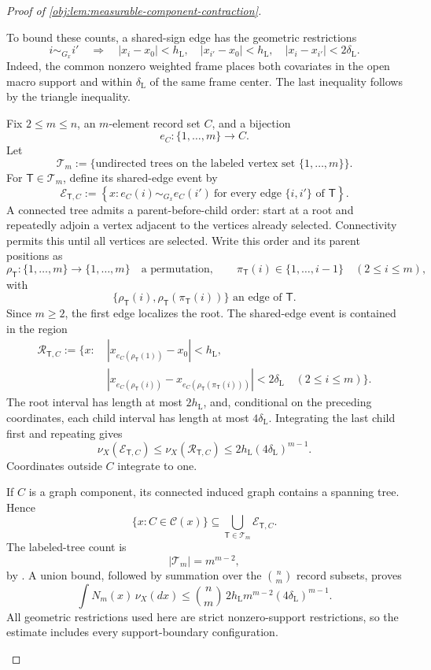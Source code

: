 \documentclass[11pt]{article}
\begin{document}
\begin{proof}[Proof of \cref{obj:lem:measurable-component-contraction}]
\begin{enumerate}
To bound these counts, a shared-sign edge has the geometric restrictions
\[
i\sim_{G_x}i'
\quad\Longrightarrow\quad
|x_i-x_0|<h_{\mathrm L},
\quad
|x_{i'}-x_0|<h_{\mathrm L},
\quad
|x_i-x_{i'}|<2\delta_{\mathrm L}.
\]
Indeed, the common nonzero weighted frame places both covariates in the open macro support and within \(\delta_{\mathrm L}\) of the same frame center. The last inequality follows by the triangle inequality.

Fix \(2\le m\le n\), an \(m\)-element record set \(C\), and a bijection
\[
e_C:\{1,\ldots,m\}\longrightarrow C.
\]
Let
\[
\mathscr T_m
:=\{\text{undirected trees on the labeled vertex set }\{1,\ldots,m\}\}.
\]
For \(\mathsf T\in\mathscr T_m\), define its shared-edge event by
\[
\mathcal E_{\mathsf T,C}
:=
\left\{
x:
e_C(i)\sim_{G_x}e_C(i')
\ \text{for every edge }\{i,i'\}\text{ of }\mathsf T
\right\}.
\]
A connected tree admits a parent-before-child order: start at a root and repeatedly adjoin a vertex adjacent to the vertices already selected. Connectivity permits this until all vertices are selected. Write this order and its parent positions as
\[
\rho_{\mathsf T}:\{1,\ldots,m\}\longrightarrow\{1,\ldots,m\}
\quad\text{a permutation},
\qquad
\pi_{\mathsf T}(i)\in\{1,\ldots,i-1\}
\quad(2\le i\le m),
\]
with
\[
\{\rho_{\mathsf T}(i),\rho_{\mathsf T}(\pi_{\mathsf T}(i))\}
\text{ an edge of }\mathsf T.
\]
Since \(m\ge2\), the first edge localizes the root. The shared-edge event is contained in the region
\[
\begin{split}
\mathcal R_{\mathsf T,C}:=\bigl\{x:\ &
|x_{e_C(\rho_{\mathsf T}(1))}-x_0|<h_{\mathrm L},\\
&
|x_{e_C(\rho_{\mathsf T}(i))}
 -x_{e_C(\rho_{\mathsf T}(\pi_{\mathsf T}(i)))}
 |<2\delta_{\mathrm L}
\quad(2\le i\le m)\bigr\}.
\end{split}
\]
The root interval has length at most \(2h_{\mathrm L}\), and, conditional on the preceding coordinates, each child interval has length at most \(4\delta_{\mathrm L}\). Integrating the last child first and repeating gives
\[
\nu_X(\mathcal E_{\mathsf T,C})
\le\nu_X(\mathcal R_{\mathsf T,C})
\le2h_{\mathrm L}(4\delta_{\mathrm L})^{m-1}.
\]
Coordinates outside \(C\) integrate to one.

If \(C\) is a graph component, its connected induced graph contains a spanning tree. Hence
\[
\{x:C\in\mathscr C(x)\}
\subseteq
\bigcup_{\mathsf T\in\mathscr T_m}\mathcal E_{\mathsf T,C}.
\]
The labeled-tree count is
\[
|\mathscr T_m|=m^{m-2},
\]
by \citep[Section 5.6, Theorem 5.40]{KellerTrotterAppliedCombinatorics}. A union bound, followed by summation over the \(\binom nm\) record subsets, proves
\[
\int N_m(x)\,\nu_X(dx)
\le
\binom nm\,2h_{\mathrm L}m^{m-2}
 (4\delta_{\mathrm L})^{m-1}.
\]
All geometric restrictions used here are strict nonzero-support restrictions, so the estimate includes every support-boundary configuration.


\end{enumerate}
\end{proof}
\end{document}
